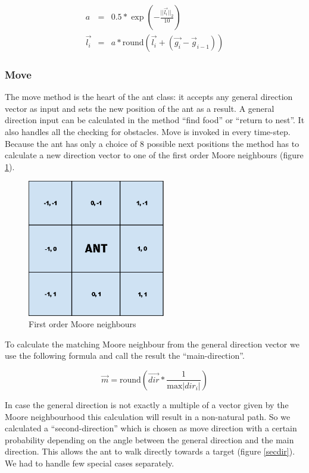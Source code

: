 \documentclass[11pt]{article}
\begin{document}
\begin{eqnarray}
a & = & 0.5 * \exp \left(-\frac{||\vec{l_i}||_2}{10}\right) \\
\vec{l_i} & = & a * \text{round} \left(\vec{l_i}  + \left(\vec{g_i} - {\vec{g}_{i-1}}\right)\right)
\end{eqnarray}

\subsubsection{Move}
The move method is the heart of the ant class: it accepts any general direction vector as input and sets the new position of the ant as a result. A general direction input can be calculated in the method “find food” or “return to nest”. It also handles all the checking for obstacles. Move is invoked in every time-step. Because the ant has only a choice of 8 possible next positions the method has to calculate a new direction vector to one of the first order Moore neighbours (figure \ref{moore}).
\begin{figure}
\centering
\includegraphics[width=6cm]{images/Mooreneighbours.pdf}
\caption[First order moore neighbours]{First order Moore neighbours\cite{soms}}
\label{moore}
\end{figure}

To calculate the matching Moore neighbour from the general direction vector we use the following formula and call the result the “main-direction”.

\begin{equation}
\vec{m} = \text{round}\left(\vec{dir}*\frac{1}{\text{max}|dir_i|}\right)
\end{equation}

In case the general direction is not exactly a multiple of a vector given by the Moore neighbourhood this calculation will result in a non-natural path. So we calculated a “second-direction” which is chosen as move direction with a certain probability depending on the angle between the general direction and the main direction. This allows the ant to walk directly towards a target (figure \ref{secdir}). We had to handle few special cases separately.
\end{document}
